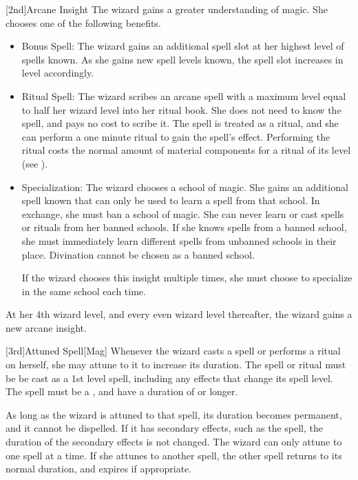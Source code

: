         [2nd]{Arcane Insight}\label{Arcane Insight}
        The wizard gains a greater understanding of magic.
        She chooses one of the following benefits.
        \begin{itemize}
            \item Bonus Spell: The wizard gains an additional spell slot at her highest level of spells known.
                As she gains new spell levels known, the spell slot increases in level accordingly.
            \item Ritual Spell: The wizard scribes an arcane spell with a maximum level equal to half her wizard level into her ritual book.
                She does not need to know the spell, and pays no cost to scribe it.
                The spell is treated as a ritual, and she can perform a one minute ritual to gain the spell's effect.
                Performing the ritual costs the normal amount of material components for a ritual of its level (see ).
            \item Specialization: The wizard chooses a school of magic.
                She gains an additional spell known that can only be used to learn a spell from that school.
                In exchange, she must ban a school of magic.
                She can never learn or cast spells or rituals from her banned schools.
                If she knows spells from a banned school, she must immediately learn different spells from unbanned schools in their place.
                Divination cannot be chosen as a banned school.
                \par If the wizard chooses this insight multiple times, she must choose to specialize in the same school each time.
        \end{itemize}

        At her 4th wizard level, and every even wizard level thereafter, the wizard gains a new arcane insight.

        [3rd]{Attuned Spell}[Mag]
        Whenever the wizard casts a spell or performs a ritual on herself, she may attune to it to increase its duration.
        The spell or ritual must be be cast as a 1st level spell, including any effects that change its spell level.
        The spell must be a , and have a duration of \durshort or longer.

        As long as the wizard is attuned to that spell, its duration becomes permanent, and it cannot be dispelled.
        If it has secondary effects, such as the  spell, the duration of the secondary effects is not changed.
        The wizard can only attune to one spell at a time.
        If she attunes to another spell, the other spell returns to its normal duration, and expires if appropriate.

